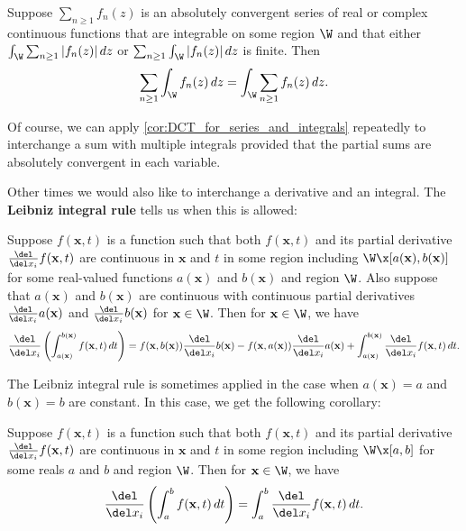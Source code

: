     \begin{corollary}\label{cor:DCT_for_series_and_integrals}
      Suppose $\sum_{n \ge 1}f_{n}(z)$ is an absolutely convergent series of real or complex continuous functions that are integrable on some region $\W$ and that either $\int_{\W}\sum_{n \ge 1}|f_{n}(z)|\,dz$ or $\sum_{n \ge 1}\int_{\W}|f_{n}(z)|\,dz$ is finite. Then
      \[
        \sum_{n \ge 1}\int_{\W}f_{n}(z)\,dz = \int_{\W}\sum_{n \ge 1}f_{n}(z)\,dz.
      \]
    \end{corollary}

    Of course, we can apply \cref{cor:DCT_for_series_and_integrals} repeatedly to interchange a sum with multiple integrals provided that the partial sums are absolutely convergent in each variable.

    Other times we would also like to interchange a derivative and an integral. The \textbf{Leibniz integral rule} tells us when this is allowed:

    \begin{theorem}
      Suppose $f(\mathbf{x},t)$ is a function such that both $f(\mathbf{x},t)$ and its partial derivative $\frac{\del}{\del x_{i}}f(\mathbf{x},t)$ are continuous in $\mathbf{x}$ and $t$ in some region including $\W \x [a(\mathbf{x}),b(\mathbf{x})]$ for some real-valued functions $a(\mathbf{x})$ and $b(\mathbf{x})$ and region $\W$. Also suppose that $a(\mathbf{x})$ and $b(\mathbf{x})$ are continuous with continuous partial derivatives $\frac{\del}{\del x_{i}}a(\mathbf{x})$ and $\frac{\del}{\del x_{i}}b(\mathbf{x})$ for $\mathbf{x} \in \W$. Then for $\mathbf{x} \in \W$, we have
      \[
        \frac{\del}{\del x_{i}}\left(\int_{a(\mathbf{x})}^{b(\mathbf{x})}f(\mathbf{x},t)\,dt\right) = f(\mathbf{x},b(\mathbf{x}))\frac{\del}{\del x_{i}}b(\mathbf{x})-f(\mathbf{x},a(\mathbf{x}))\frac{\del}{\del x_{i}}a(\mathbf{x})+\int_{a(\mathbf{x})}^{b(\mathbf{x})}\frac{\del}{\del x_{i}}f(\mathbf{x},t)\,dt.
      \]
    \end{theorem}
    
    The Leibniz integral rule is sometimes applied in the case when $a(\mathbf{x}) = a$ and $b(\mathbf{x}) = b$ are constant. In this case, we get the following corollary:

    \begin{corollary}
      Suppose $f(\mathbf{x},t)$ is a function such that both $f(\mathbf{x},t)$ and its partial derivative $\frac{\del}{\del x_{i}}f(\mathbf{x},t)$ are continuous in $\mathbf{x}$ and $t$ in some region including $\W \x [a,b]$ for some reals $a$ and $b$ and region $\W$. Then for $\mathbf{x} \in \W$, we have
      \[
        \frac{\del}{\del x_{i}}\left(\int_{a}^{b}f(\mathbf{x},t)\,dt\right) = \int_{a}^{b}\frac{\del}{\del x_{i}}f(\mathbf{x},t)\,dt.
      \]
    \end{corollary}
